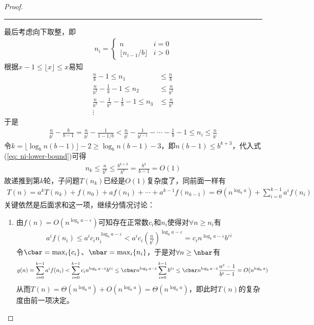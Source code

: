 \documentclass{ctexart}
\begin{document}
\begin{proof}
    \noindent \rule[0.25\baselineskip]{\textwidth}{0.5pt}

    最后考虑向下取整，即
    \begin{align*}
        n_i = \begin{cases}
                  n & i = 0 \\ \lfloor n_{i-1}/b \rfloor & i > 0
              \end{cases}
    \end{align*}
    根据$x-1 \le \lfloor x \rfloor \le x$易知
    \begin{align*}
        \frac{n}{b} - 1   \le n_1                               & \le \frac{n}{b}   \\
        \frac{n}{b^2} - \frac{1}{b} - 1    \le n_2              & \le \frac{n}{b^2} \\
        \frac{n}{b^3} - \frac{1}{b^2} - \frac{1}{b} - 1 \le n_3 & \le \frac{n}{b^3} \\
        \vdots                                                  &
    \end{align*}
    于是
    \begin{align} \label{eq: ni-lower-bound}
        \frac{n}{b^i} - \frac{b}{b-1} = \frac{n}{b^i} - \frac{1}{1 - 1/b} < \frac{n}{b^i} - \frac{1}{b^{i-1}} - \cdots - \frac{1}{b} - 1 \le n_i \le \frac{n}{b^i}
    \end{align}
    令$k = \lfloor \log_b n(b-1) \rfloor - 2 \ge \log_b n(b-1) - 3$，即$n(b-1) \le b^{k+3}$，代入式(\ref{eq: ni-lower-bound})可得
    \begin{align*}
        n_k \le \frac{n}{b^k} \le \frac{b^{k+3}}{b^k} = \frac{b^3}{b-1} = O(1)
    \end{align*}
    故递推到第$k$轮，子问题$T(n_k)$已经是$O(1)$复杂度了，同前面一样有
    \begin{align*}
        T(n) = a^k T(n_k) + f(n_0) + a f(n_1) + \cdots + a^{k-1} f(n_{k-1}) = \Theta(n^{\log_b a}) + \sum_{i=0}^{k-1} a^i f(n_i)
    \end{align*}
    关键依然是后面求和这一项，继续分情况讨论：
    \begin{enumerate}
        \item 由$f(n) = O(n^{\log_b a - \varepsilon})$可知存在正常数$c_i$和$n_i$使得对$\forall n \ge n_i$有
              \begin{align*}
                  a^i f(n_i) \le a^i c_i n_i^{\log_b a - \varepsilon} < a^i c_i \left( \frac{n}{b^i} \right)^{\log_b a - \varepsilon} = c_i n^{\log_b a - \varepsilon} b^{\varepsilon i}
              \end{align*}
              令$\cbar = \max_i \{c_i\}$、$\nbar = \max_i \{n_i\}$，于是对$\forall n \ge \nbar$有
              \begin{align*}
                  g(n) & = \sum_{i=0}^{k-1} a^i f(n_i) < \sum_{i=0}^{k-1} c_i n^{\log_b a - \varepsilon} b^{\varepsilon i} \le \cbar n^{\log_b a - \varepsilon} \sum_{i=0}^{k-1} b^{\varepsilon i} \le \cbar n^{\log_b a - \varepsilon} \frac{n^\varepsilon - 1}{b^\varepsilon - 1} = O(n^{\log_b a})
              \end{align*}
              从而$T(n) = \Theta(n^{\log_b a}) + O(n^{\log_b a}) = \Theta(n^{\log_b a})$，即此时$T(n)$的复杂度由前一项决定。


\end{enumerate}
\end{proof}
\end{document}
